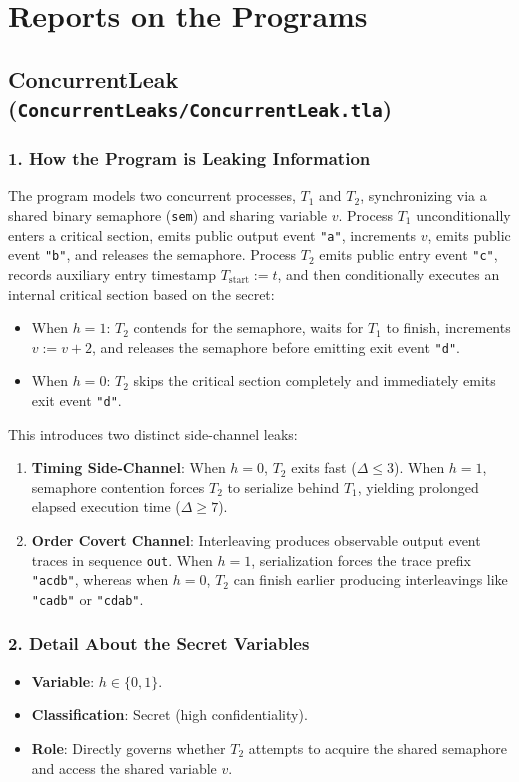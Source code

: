 \documentclass[a4paper,11pt]{article}
\begin{document}
\bigskip

\section{Reports on the Programs}

\subsection{ConcurrentLeak (\texttt{ConcurrentLeaks/ConcurrentLeak.tla})}

\subsubsection{1. How the Program is Leaking Information}
The program models two concurrent processes, $T_1$ and $T_2$, synchronizing via a shared binary semaphore (\texttt{sem}) and sharing variable $v$. Process $T_1$ unconditionally enters a critical section, emits public output event \texttt{"a"}, increments $v$, emits public event \texttt{"b"}, and releases the semaphore. Process $T_2$ emits public entry event \texttt{"c"}, records auxiliary entry timestamp $T_{\text{start}} := t$, and then conditionally executes an internal critical section based on the secret:
\begin{itemize}
    \item When $h = 1$: $T_2$ contends for the semaphore, waits for $T_1$ to finish, increments $v := v + 2$, and releases the semaphore before emitting exit event \texttt{"d"}.
    \item When $h = 0$: $T_2$ skips the critical section completely and immediately emits exit event \texttt{"d"}.
\end{itemize}
This introduces two distinct side-channel leaks:
\begin{enumerate}
    \item \textbf{Timing Side-Channel}: When $h = 0$, $T_2$ exits fast ($\Delta \le 3$). When $h = 1$, semaphore contention forces $T_2$ to serialize behind $T_1$, yielding prolonged elapsed execution time ($\Delta \ge 7$).
    \item \textbf{Order Covert Channel}: Interleaving produces observable output event traces in sequence \texttt{out}. When $h = 1$, serialization forces the trace prefix \texttt{"acdb"}, whereas when $h = 0$, $T_2$ can finish earlier producing interleavings like \texttt{"cadb"} or \texttt{"cdab"}.
\end{enumerate}

\subsubsection{2. Detail About the Secret Variables}
\begin{itemize}
    \item \textbf{Variable}: $h \in \{0, 1\}$.
    \item \textbf{Classification}: Secret (high confidentiality).
    \item \textbf{Role}: Directly governs whether $T_2$ attempts to acquire the shared semaphore and access the shared variable $v$.
\end{itemize}
\end{document}
